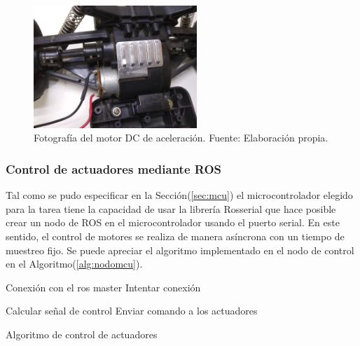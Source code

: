     \begin{figure}[!h] 
        \centering
        \includegraphics[width=0.55\textwidth]{img/dcmotor}
        \caption[Fotografía del motor DC de aceleración]{Fotografía del motor DC de aceleración. Fuente: Elaboración propia. }
        \label{fig:dcmotor}
    \end{figure}

        \subsubsection{Control de actuadores mediante ROS}
        Tal como se pudo especificar en la Sección(\ref{sec:mcu}) el microcontrolador elegido para la tarea tiene la capacidad de usar la 
        librería Rosserial que hace posible crear un nodo de ROS en el microcontrolador usando el puerto serial. En este sentido, 
        el control de motores se realiza de manera asíncrona con un tiempo de muestreo fijo. Se puede apreciar el algoritmo 
        implementado en el nodo de control en el Algoritmo(\ref{alg:nodomcu}).

        \begin{algorithm}
            \begin{algorithmic}[1]
            \STATE Conexión con el ros master
            \STATE Intentar conexión
            \ENDWHILE
            
                    \STATE Calcular señal de control
                    \STATE Enviar comando a los actuadores
                \ENDIF
            \ENDWHILE
            \end{algorithmic}
            \caption{Algoritmo de control de actuadores}\label{alg:nodomcu}
        \end{algorithm}
        
